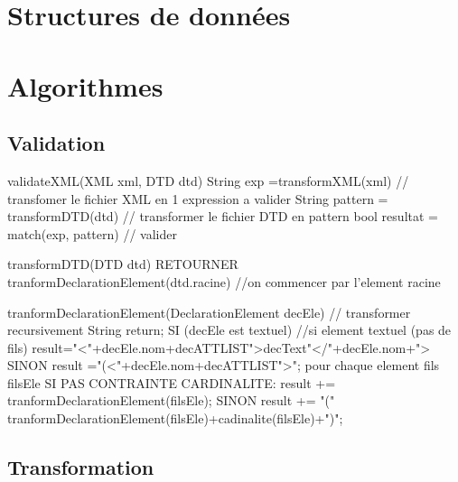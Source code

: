 \section{Structures de données}

    
\section{Algorithmes}

    \subsection{Validation}
	
	validateXML(XML xml, DTD dtd){
		String exp =transformXML(xml) // transfomer le fichier XML en 1 expression a valider
		String pattern = transformDTD(dtd) // transformer le fichier DTD en pattern 
		bool resultat = match(exp, pattern) // valider 		
	}

	transformDTD(DTD dtd){
		RETOURNER tranformDeclarationElement(dtd.racine) //on commencer par l'element racine
	}

	tranformDeclarationElement(DeclarationElement decEle) // transformer recursivement 
	{
		String return;
		SI (decEle est textuel) //si element textuel (pas de fils)
		{
			result="<"+decEle.nom+decATTLIST">decText"</"+decEle.nom+">
		}
		SINON
		{
			result ="(<"+decEle.nom+decATTLIST">";
			pour chaque element fils filsEle{
				SI PAS CONTRAINTE CARDINALITE:
					result += tranformDeclarationElement(filsEle);
				SINON
					result += "(" tranformDeclarationElement(filsEle)+cadinalite(filsEle)+")";
			}	
		}
	}

        
    \subsection{Transformation}
